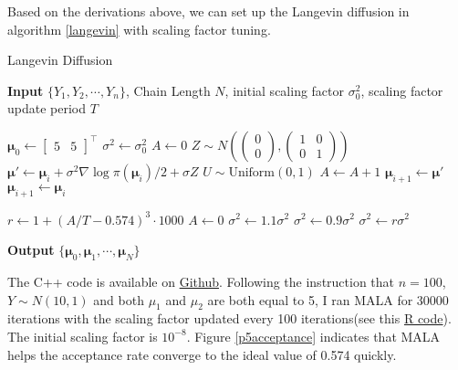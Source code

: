 \documentclass[12pt]{article}
\begin{document}
Based on the derivations above, we can set up the Langevin diffusion in algorithm \ref{langevin} with scaling factor tuning. 

\begin{algorithm}
	\caption{Langevin Diffusion}\label{langevin}
	\hspace*{\algorithmicindent} \textbf{Input}  $\{Y_1, Y_2, \cdots, Y_n \}$, Chain Length $N$, initial scaling factor $\sigma_0^2$, scaling factor update period $T$ 
	\begin{algorithmic}[1]
		\State $\bm{\mu}_0 \gets \begin{bmatrix}5 & 5\end{bmatrix}^\top$
		\State $\sigma^2 \gets \sigma_0^2$
		\State $A \gets 0$ 
		\State $Z\sim N\left(\begin{pmatrix}0 \\ 0\end{pmatrix}, \begin{pmatrix}1 & 0 \\ 0 & 1\end{pmatrix} \right)$
		\State $\bm{\mu}' \gets \bm{\mu}_i + \sigma^2 \nabla \log \pi(\bm{\mu}_i)/2 + \sigma Z$
		\State $U\sim \text{Uniform}(0, 1)$
		\State $A\gets A+1$
		\State $\bm{\mu}_{i+1}\gets \bm{\mu}'$
		\Else
		\State $\bm{\mu}_{i+1}\gets \bm{\mu}_{i}$
		\EndIf
		
		 
			\State $r\gets 1+(A/T - 0.574)^3 \cdot 1000$
			\State $A\gets 0$
				\State $\sigma^2 \gets 1.1\sigma^2$
				\State $\sigma^2 \gets 0.9\sigma^2$
			\Else
				\State $\sigma^2 \gets r \sigma^2$
			\EndIf
		\EndIf
		\EndFor
	\end{algorithmic}
	\hspace*{\algorithmicindent} \textbf{Output} $\{ \bm{\mu}_0, \bm{\mu}_1, \cdots, \bm{\mu}_N \}$
\end{algorithm}

The C++ code is available on \href{https://github.com/mkbwang/BIOSTAT882/blob/master/HW1/P5.cpp}{Github}. Following the instruction that $n=100$, $Y\sim N(10, 1)$ and both $\mu_1$ and $\mu_2$ are both equal to 5, I ran MALA for 30000 iterations with the scaling factor updated every 100 iterations(see this \href{https://github.com/mkbwang/BIOSTAT882/blob/master/HW1/P5.R}{R code}). The initial scaling factor is $10^{-8}$. Figure \ref{p5acceptance} indicates that MALA helps the acceptance rate converge to the ideal value of 0.574 quickly. 
\end{document}
